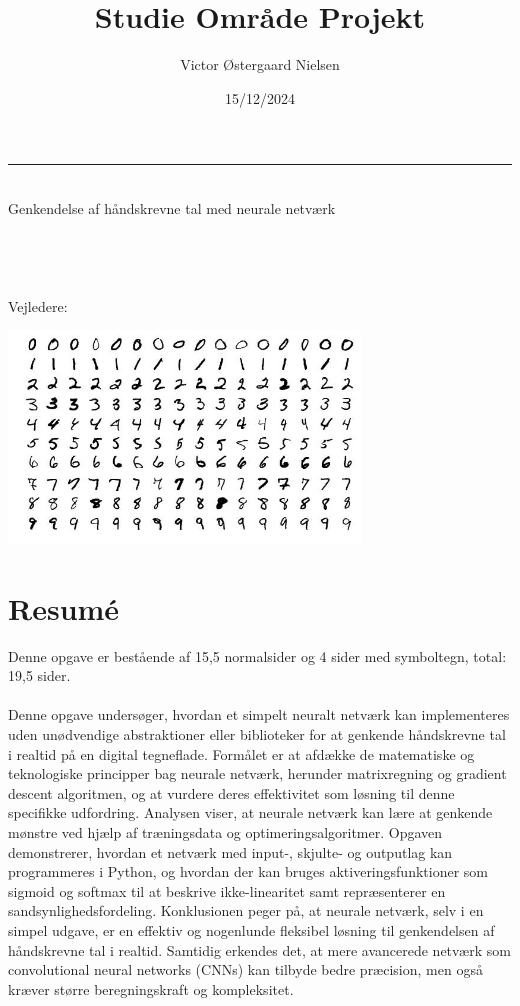 \documentclass{article}
\title{\Huge{Studie Område Projekt}}
\author{Victor Østergaard Nielsen}
\date{15/12/2024}
\makeatletter
\renewcommand{\maketitle}{\bgroup\setlength{\parindent}{0pt}
\begin{flushleft}
  \textbf{\@title}
  \rule{\textwidth}{0.2pt}\\\vspace{0.2em}
  \huge{
    Genkendelse af håndskrevne tal med neurale netværk
  }\\\vspace{1em}
  \normalsize
  \@subject\\\vspace{1em}
  \@author\\
  \@class\\
  \@date\\\vspace{1em}
  Vejledere:\\\@mentor
\end{flushleft}\egroup
}
\makeatother
\begin{document}
\thispagestyle{empty}


\maketitle
\vspace{3cm}
\begin{center}
  \includegraphics[width=0.7\textwidth]{MNIST3.jpg}
\end{center}
\thispagestyle{empty}
\newpage

\section*{Resumé}
Denne opgave er bestående af 15,5 normalsider og 4 sider med symboltegn, total: 19,5 sider.\\\\
Denne opgave undersøger, hvordan et simpelt neuralt netværk kan implementeres uden unødvendige abstraktioner eller biblioteker for at genkende håndskrevne tal i realtid på en digital tegneflade. Formålet er at afdække de matematiske og teknologiske principper bag neurale netværk, herunder matrixregning og gradient descent algoritmen, og at vurdere deres effektivitet som løsning til denne specifikke udfordring. Analysen viser, at neurale netværk kan lære at genkende mønstre ved hjælp af træningsdata og optimeringsalgoritmer. Opgaven demonstrerer, hvordan et netværk med input-, skjulte- og outputlag kan programmeres i Python, og hvordan der kan bruges aktiveringsfunktioner som sigmoid og softmax til at beskrive ikke-linearitet samt repræsenterer en sandsynlighedsfordeling. Konklusionen peger på, at neurale netværk, selv i en simpel udgave, er en effektiv og nogenlunde fleksibel løsning til genkendelsen af håndskrevne tal i realtid. Samtidig erkendes det, at mere avancerede netværk som convolutional neural networks (CNNs) kan tilbyde bedre præcision, men også kræver større beregningskraft og kompleksitet.
\newpage
\end{document}

